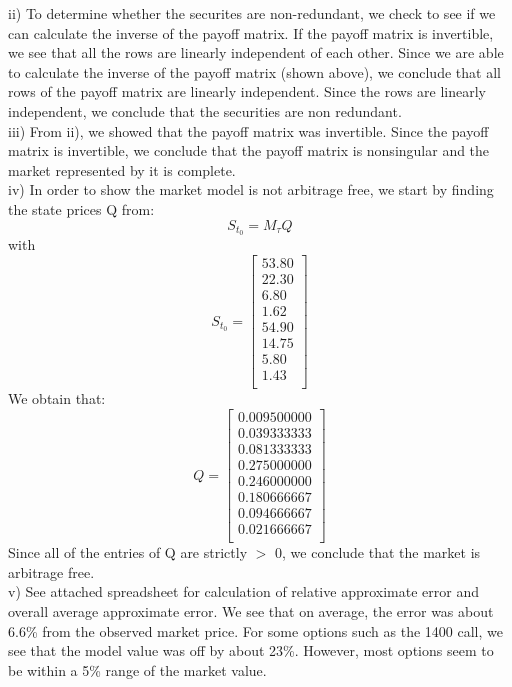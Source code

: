\documentclass{article}
\begin{document}
ii) To determine whether the securites are non-redundant, we check to see if we can calculate the inverse of the payoff matrix. If the payoff matrix is invertible, we see that all the rows are linearly independent of each other. Since we are able to calculate the inverse of the payoff matrix (shown above), we conclude that all rows of the payoff matrix are linearly independent. Since the rows are linearly independent, we conclude that the securities are non redundant.
\vspace{5mm} \\
iii) From ii), we showed that the payoff matrix was invertible. Since the payoff matrix is invertible, we conclude that the payoff matrix is nonsingular and the market represented by it is complete.
\vspace{5mm} \\
iv) In order to show the market model is not arbitrage free, we start by finding the state prices Q from:
\begin{equation*}
S_{t_{0}} = M_{\tau}Q 
\end{equation*}
with
\begin{equation*}
S_{t_{0}} = %
\begin{bmatrix}{}
 53.80 \\ 
  22.30 \\ 
  6.80 \\ 
  1.62 \\ 
  54.90 \\ 
  14.75 \\ 
  5.80 \\ 
  1.43 \\ 
  \end{bmatrix}
\end{equation*}
We obtain that: 
\begin{equation*}
Q = %
\begin{bmatrix}{}
 0.009500000 \\ 
  0.039333333 \\ 
  0.081333333 \\ 
  0.275000000 \\ 
  0.246000000 \\ 
  0.180666667 \\ 
  0.094666667 \\ 
  0.021666667 \\ 
  \end{bmatrix}
\end{equation*}
Since all of the entries of Q are strictly $>$ 0, we conclude that the market is arbitrage free.
\vspace{5mm} \\
v) See attached spreadsheet for calculation of relative approximate error and overall average approximate error. We see that on average, the error was about 6.6\% from the observed market price. For some options such as the 1400 call, we see that the model value was off by about 23\%. However, most options seem to be within a 5\% range of the market value.
\end{document}
